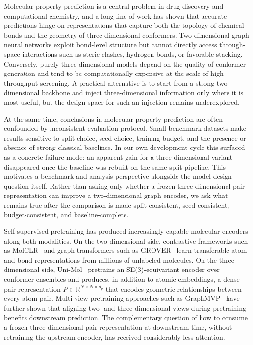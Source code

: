 \documentclass[conference]{IEEEtran}
\begin{document}
Molecular property prediction is a central problem in drug discovery and computational chemistry, and a long line of work has shown that accurate predictions hinge on representations that capture both the topology of chemical bonds and the geometry of three-dimensional conformers. Two-dimensional graph neural networks exploit bond-level structure but cannot directly access through-space interactions such as steric clashes, hydrogen bonds, or favorable stacking. Conversely, purely three-dimensional models depend on the quality of conformer generation and tend to be computationally expensive at the scale of high-throughput screening. A practical alternative is to start from a strong two-dimensional backbone and inject three-dimensional information only where it is most useful, but the design space for such an injection remains underexplored.

At the same time, conclusions in molecular property prediction are often confounded by inconsistent evaluation protocol. Small benchmark datasets make results sensitive to split choice, seed choice, training budget, and the presence or absence of strong classical baselines. In our own development cycle this surfaced as a concrete failure mode: an apparent gain for a three-dimensional variant disappeared once the baseline was rebuilt on the same split pipeline. This motivates a benchmark-and-analysis perspective alongside the model-design question itself. Rather than asking only whether a frozen three-dimensional pair representation can improve a two-dimensional graph encoder, we ask what remains true after the comparison is made split-consistent, seed-consistent, budget-consistent, and baseline-complete.

Self-supervised pretraining has produced increasingly capable molecular encoders along both modalities. On the two-dimensional side, contrastive frameworks such as MolCLR~\cite{wang2022molclr} and graph transformers such as GROVER~\cite{rong2020grover} learn transferable atom and bond representations from millions of unlabeled molecules. On the three-dimensional side, Uni-Mol~\cite{zhou2023unimol} pretrains an SE(3)-equivariant encoder over conformer ensembles and produces, in addition to atomic embeddings, a dense pair representation $P \in \mathbb{R}^{N \times N \times d_p}$ that encodes geometric relationships between every atom pair. Multi-view pretraining approaches such as GraphMVP~\cite{liu2022graphmvp} have further shown that aligning two- and three-dimensional views during pretraining benefits downstream prediction. The complementary question of how to consume a frozen three-dimensional pair representation at downstream time, without retraining the upstream encoder, has received considerably less attention.
\end{document}
